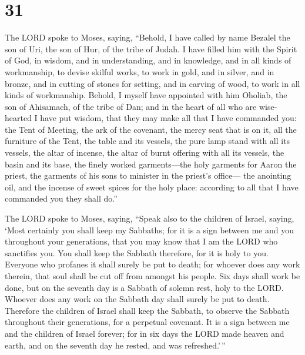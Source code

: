 \hypertarget{section-30}{%
\section{31}\label{section-30}}

 The LORD spoke to Moses, saying,  ``Behold, I
have called by name Bezalel the son of Uri, the son of Hur, of the tribe
of Judah.  I have filled him with the Spirit of God, in
wisdom, and in understanding, and in knowledge, and in all kinds of
workmanship,  to devise skilful works, to work in gold, and
in silver, and in bronze,  and in cutting of stones for
setting, and in carving of wood, to work in all kinds of workmanship.
 Behold, I myself have appointed with him Oholiab, the son
of Ahisamach, of the tribe of Dan; and in the heart of all who are
wise-hearted I have put wisdom, that they may make all that I have
commanded you:  the Tent of Meeting, the ark of the
covenant, the mercy seat that is on it, all the furniture of the Tent,
 the table and its vessels, the pure lamp stand with all its
vessels, the altar of incense,  the altar of burnt offering
with all its vessels, the basin and its base,  the finely
worked garments---the holy garments for Aaron the priest, the garments
of his sons to minister in the priest's office---  the
anointing oil, and the incense of sweet spices for the holy place:
according to all that I have commanded you they shall do.''

 The LORD spoke to Moses, saying,  ``Speak
also to the children of Israel, saying, `Most certainly you shall keep
my Sabbaths; for it is a sign between me and you throughout your
generations, that you may know that I am the LORD who sanctifies you.
 You shall keep the Sabbath therefore, for it is holy to
you. Everyone who profanes it shall surely be put to death; for whoever
does any work therein, that soul shall be cut off from amongst his
people.  Six days shall work be done, but on the seventh
day is a Sabbath of solemn rest, holy to the LORD. Whoever does any work
on the Sabbath day shall surely be put to death.  Therefore
the children of Israel shall keep the Sabbath, to observe the Sabbath
throughout their generations, for a perpetual covenant.  It
is a sign between me and the children of Israel forever; for in six days
the LORD made heaven and earth, and on the seventh day he rested, and
was refreshed.'\,''

